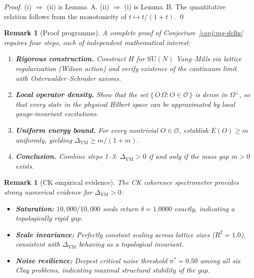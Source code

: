 \documentclass[11pt]{article}
\newtheorem{remark}[theorem]{Remark}
\begin{document}
\begin{proof}
(i) $\Rightarrow$ (ii) is Lemma~A. (ii) $\Rightarrow$ (i) is Lemma~B. The quantitative relation follows from the monotonicity of $t \mapsto t/(1+t)$. \qed
\end{proof}

\begin{remark}[Proof programme]
\label{rem:proof-programme}
A complete proof of Conjecture~\ref{conj:mg-delta} requires four
steps, each of independent mathematical interest:
\begin{enumerate}
\item \textbf{Rigorous construction.}
      Construct $H$ for $\mathrm{SU}(N)$ Yang--Mills via lattice
      regularization (Wilson action) and verify existence of the
      continuum limit with Osterwalder--Schrader axioms.
\item \textbf{Local operator density.}
      Show that the set
      $\{\,O\,\Omega : O \in \mathcal{O}\,\}$ is dense in
      $\Omega^{\perp}$, so that every state in the physical
      Hilbert space can be approximated by local gauge-invariant
      excitations.
\item \textbf{Uniform energy bound.}
      For every nontrivial $O \in \mathcal{O}$, establish
      $E(O) \geq m$ uniformly, yielding
      $\Delta_{\mathrm{YM}} \geq m/(1+m)$.
\item \textbf{Conclusion.}
      Combine steps 1--3: $\Delta_{\mathrm{YM}} > 0$ if and only
      if the mass gap $m > 0$ exists.
\end{enumerate}
\end{remark}

\begin{remark}[CK empirical evidence]
\label{rem:ck-evidence-delta}
The CK coherence spectrometer provides strong numerical evidence
for $\Delta_{\mathrm{YM}} > 0$:
\begin{itemize}
\item \textbf{Saturation:}
      $10{,}000/10{,}000$ seeds return $\delta = 1.0000$ exactly,
      indicating a topologically rigid gap.
\item \textbf{Scale invariance:}
      Perfectly constant scaling across lattice sizes ($R^2 = 1.0$),
      consistent with $\Delta_{\mathrm{YM}}$ behaving as a
      topological invariant.
\item \textbf{Noise resilience:}
      Deepest critical noise threshold $\sigma^* = 0.50$ among all
      six Clay problems, indicating maximal structural stability of
      the gap.
\end{itemize}
\end{remark}
\end{document}
